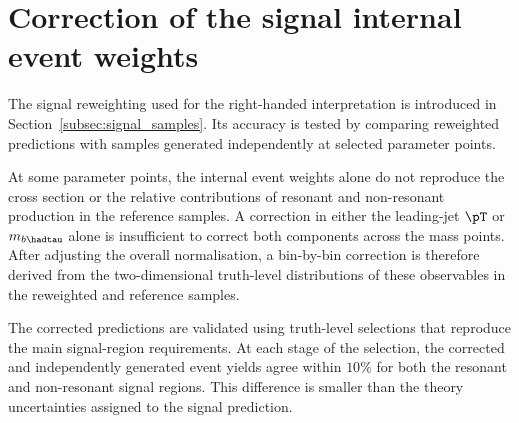 \chapter{Correction of the signal internal event weights}
\label{app:signal_weight_correction}

The signal reweighting used for the right-handed interpretation is introduced in Section~\ref{subsec:signal_samples}.
Its accuracy is tested by comparing reweighted predictions with samples generated independently at selected parameter points.

At some parameter points, the internal event weights alone do not reproduce the cross section or the relative contributions of resonant and non-resonant production in the reference samples.
A correction in either the leading-jet $\pT$ or $m_{b\hadtau}$ alone is insufficient to correct both components across the mass points.
After adjusting the overall normalisation, a bin-by-bin correction is therefore derived from the two-dimensional truth-level distributions of these observables in the reweighted and reference samples.

The corrected predictions are validated using truth-level selections that reproduce the main signal-region requirements.
At each stage of the selection, the corrected and independently generated event yields agree within $10\%$ for both the resonant and non-resonant signal regions.
This difference is smaller than the theory uncertainties assigned to the signal prediction.
